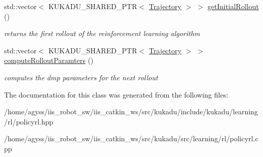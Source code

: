 \begin{DoxyCompactItemize}
\item 
std\+::vector$<$ K\+U\+K\+A\+D\+U\+\_\+\+S\+H\+A\+R\+E\+D\+\_\+\+P\+TR$<$ \hyperlink{classkukadu_1_1Trajectory}{Trajectory} $>$ $>$ \hyperlink{classkukadu_1_1GradientDescent_a9a8a9b125c490b1eb93a1f604219fbd6}{get\+Initial\+Rollout} ()\hypertarget{classkukadu_1_1GradientDescent_a9a8a9b125c490b1eb93a1f604219fbd6}{}\label{classkukadu_1_1GradientDescent_a9a8a9b125c490b1eb93a1f604219fbd6}

\begin{DoxyCompactList}\small\item\em returns the first rollout of the reinforcement learning algorithm \end{DoxyCompactList}\item 
std\+::vector$<$ K\+U\+K\+A\+D\+U\+\_\+\+S\+H\+A\+R\+E\+D\+\_\+\+P\+TR$<$ \hyperlink{classkukadu_1_1Trajectory}{Trajectory} $>$ $>$ \hyperlink{classkukadu_1_1GradientDescent_abd9d198e248e55a54a346f97a5cce987}{compute\+Rollout\+Paramters} ()\hypertarget{classkukadu_1_1GradientDescent_abd9d198e248e55a54a346f97a5cce987}{}\label{classkukadu_1_1GradientDescent_abd9d198e248e55a54a346f97a5cce987}

\begin{DoxyCompactList}\small\item\em computes the dmp parameters for the next rollout \end{DoxyCompactList}\end{DoxyCompactItemize}


The documentation for this class was generated from the following files\+:\begin{DoxyCompactItemize}
\item 
/home/agyss/iis\+\_\+robot\+\_\+sw/iis\+\_\+catkin\+\_\+ws/src/kukadu/include/kukadu/learning/rl/policyrl.\+hpp\item 
/home/agyss/iis\+\_\+robot\+\_\+sw/iis\+\_\+catkin\+\_\+ws/src/kukadu/src/learning/rl/policyrl.\+cpp\end{DoxyCompactItemize}
